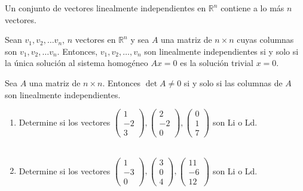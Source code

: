 \begin{cor}
Un conjunto de vectores linealmente independientes en $\mathbb{R}^n$ contiene a lo más $n$ vectores.
\end{cor}





\begin{thm}
Sean $v_1, v_2, \dots v_n$, $n$ vectores en $\mathbb{R}^n$ y sea $A$ una matriz de $n \times n$ cuyas columnas son $v_1, v_2, \dots v_n$. Entonces, $v_1, v_2, \dots, v_n$ son linealmente independientes si y solo si la única solución al sistema homogéneo $Ax = 0$ es la solución trivial $x = 0$.
\end{thm}

\begin{thm}
Sea $A$ una matriz de $n \times n$. Entonces $\det A \not= 0$ si y solo si las columnas de $A$ son linealmente independientes.
\end{thm}





\begin{ejem}
\begin{enumerate}
\item
Determine si los vectores $\begin{pmatrix} 1 \\ -2 \\ 3 \end{pmatrix}, \begin{pmatrix} 2 \\ -2 \\ 0 \end{pmatrix}, \begin{pmatrix} 0 \\ 1 \\ 7 \end{pmatrix}$ son Li o Ld.
\\\

\item
Determine si los vectores $\begin{pmatrix} 1 \\ -3 \\ 0 \end{pmatrix}, \begin{pmatrix} 3 \\ 0 \\ 4 \end{pmatrix}, \begin{pmatrix} 11 \\ -6 \\ 12 \end{pmatrix}$ son Li o Ld.
\end{enumerate}
\end{ejem}



